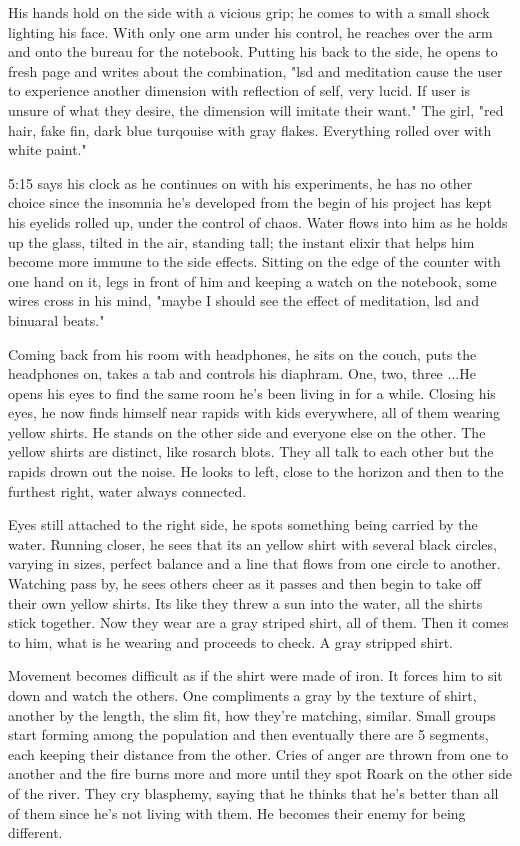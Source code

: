         His hands hold on the side with a vicious grip; he comes to with a small shock lighting his face. With only one arm under his control, he
    reaches over the arm and onto the bureau for the notebook. Putting his back to the side, he opens to fresh page and writes about the 
    combination, "lsd and meditation cause the user to experience another dimension with reflection of self, very lucid. If user is unsure of
    what they desire, the dimension will imitate their want." The girl, "red hair, fake fin, dark blue turqouise with gray flakes. Everything
    rolled over with white paint." 

        5:15 says his clock as he continues on with his experiments, he has no other choice since the insomnia he's developed from the begin of
    his project has kept his eyelids rolled up, under the control of chaos. Water flows into him as he holds up the glass, tilted in the air,
    standing tall; the instant elixir that helps him become more immune to the side effects. Sitting on the edge of the counter with one hand on
    it, legs in front of him and keeping a watch on the notebook, some wires cross in his mind, "maybe I should see the effect of meditation, lsd
    and binuaral beats."

        Coming back from his room with headphones, he sits on the couch, puts the headphones on, takes a tab and controls his diaphram. One, two,
    three ...He opens his eyes to find the same room he's been living in for a while. Closing his eyes, he now finds himself near rapids with
    kids everywhere, all of them wearing yellow shirts. He stands on the other side and everyone else on the other. The yellow shirts are distinct,
    like rosarch blots. They all talk to each other but the rapids drown out the noise. He looks to left, close to the horizon and then to the
    furthest right, water always connected.

        Eyes still attached to the right side, he spots something being carried by the water. Running closer, he sees that its an yellow shirt
    with several black circles, varying in sizes, perfect balance and a line that flows from one circle to another. Watching pass by, he sees
    others cheer as it passes and then begin to take off their own yellow shirts. Its like they threw a sun into the water, all the shirts stick
    together. Now they wear are a gray striped shirt, all of them. Then it comes to him, what is he wearing and proceeds to check. A gray
    stripped shirt.

        Movement becomes difficult as if the shirt were made of iron. It forces him to sit down and watch the others. One compliments a gray
    by the texture of shirt, another by the length, the slim fit, how they're matching, similar. Small groups start forming among the population
    and then eventually there are 5 segments, each keeping their distance from the other. Cries of anger are thrown from one to another and 
    the fire burns more and more until they spot Roark on the other side of the river. They cry blasphemy, saying that he thinks that he's better
    than all of them since he's not living with them. He becomes their enemy for being different.

